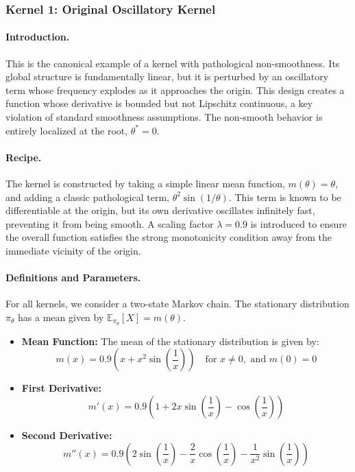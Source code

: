 \documentclass[a4paper]{article}
\begin{document}
\subsubsection*{Kernel 1: Original Oscillatory Kernel}

\paragraph{Introduction.}
This is the canonical example of a kernel with pathological non-smoothness. Its global structure is fundamentally linear, but it is perturbed by an oscillatory term whose frequency explodes as it approaches the origin. This design creates a function whose derivative is bounded but not Lipschitz continuous, a key violation of standard smoothness assumptions. The non-smooth behavior is entirely localized at the root, $\theta^*=0$.

\paragraph{Recipe.}
The kernel is constructed by taking a simple linear mean function, $m(\theta) = \theta$, and adding a classic pathological term, $\theta^2 \sin(1/\theta)$. This term is known to be differentiable at the origin, but its own derivative oscillates infinitely fast, preventing it from being smooth. A scaling factor $\lambda=0.9$ is introduced to ensure the overall function satisfies the strong monotonicity condition away from the immediate vicinity of the origin.

\paragraph{Definitions and Parameters.}
For all kernels, we consider a two-state Markov chain. The stationary distribution $\pi_\theta$ has a mean given by $\mathbb{E}_{\pi_\theta}[X] = m(\theta)$.

\begin{itemize}
	\item \textbf{Mean Function:} The mean of the stationary distribution is given by:
	\[ m(x) = 0.9 \left( x + x^2 \sin\left(\frac{1}{x}\right) \right) \quad \text{for } x \neq 0, \text{ and } m(0)=0 \]
	\item \textbf{First Derivative:}
	\[ m'(x) = 0.9 \left( 1 + 2x\sin\left(\frac{1}{x}\right) - \cos\left(\frac{1}{x}\right) \right) \]
	\item \textbf{Second Derivative:}
	\[ m''(x) = 0.9 \left( 2\sin\left(\frac{1}{x}\right) - \frac{2}{x}\cos\left(\frac{1}{x}\right) - \frac{1}{x^2}\sin\left(\frac{1}{x}\right) \right) \]
\end{itemize}
\end{document}
